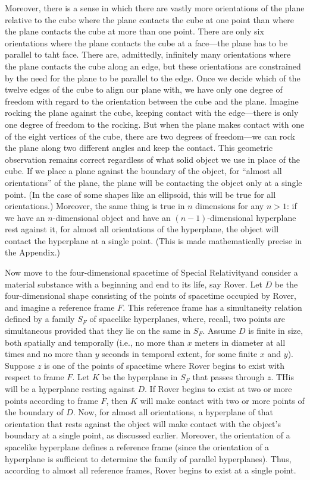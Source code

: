 Moreover, there is a sense in which there are vastly more orientations of the plane relative to the cube where the 
plane contacts the cube at one point than where the plane contacts the cube at more than one point. There are only 
six orientations where the plane contacts the cube at a face---the plane has to be parallel to taht face. There are, 
admittedly, infinitely many orientations where the plane contacts the cube along an edge, but these orientations 
are constrained by the need for the plane to be parallel to the edge. Once we decide which of the twelve edges of 
the cube to align our plane with, we have only one degree of freedom with regard to the orientation between the cube 
and the plane. Imagine rocking the plane against the cube, keeping contact with the edge---there is only one degree 
of freedom to the rocking. But when the plane makes contact with one of the eight vertices of the cube, there are two 
degrees of freedom—we can rock the plane along two different angles and keep the contact. This geometric observation 
remains correct regardless of what solid object we use in place of the cube. If we place a plane against the boundary 
of the object, for ``almost all orientations'' of the plane, the plane will be contacting the object only at a single 
point. (In the case of some shapes like an ellipsoid, this will be true for all orientations.) Moreover, the same thing is 
true in $n$ dimensions for any $n>1$: if we have an $n$-dimensional object and have an $(n-1)$-dimensional hyperplane rest 
against it, for almost all orientations of the hyperplane, the object will contact the hyperplane at a single point. 
(This is made mathematically precise in the Appendix.)

Now move to the four-dimensional spacetime of Special Relativityand consider a material substance with a beginning and end to 
its life, say Rover. Let $D$ be the four-dimensional shape consisting of the points of spacetime occupied by Rover, and 
imagine a reference frame $F$. This reference frame has a simultaneity relation defined by a family $S_F$ of spacelike 
hyperplanes, where, recall, two points are simultaneous provided that they lie on the same in $S_F$. Assume $D$ is 
finite in size, both spatially and temporally (i.e., no more than $x$ meters in diameter at all times and no more than $y$ seconds in temporal 
extent, for some finite $x$ and $y$). Suppose $z$ is one of the points of 
spacetime where Rover begins to exist with respect to frame $F$. Let $K$ be the hyperplane in $S_F$ that passes through 
$z$. THis will be a hyperplane resting against $D$. If Rover begins to exist at two or more points according to frame $F$, 
then $K$ will make contact with two or more points of the boundary of $D$. Now, for almost all 
orientations, a hyperplane of that orientation that rests against the object will make contact with the object's boundary 
at a single point, as discussed earlier. Moreover, the orientation of a spacelike hyperplane defines a reference frame (since the
orientation of a hyperplane is sufficient to determine the family of parallel hyperplanes). Thus, according to almost all 
reference frames, Rover begins to exist at a single point. 

